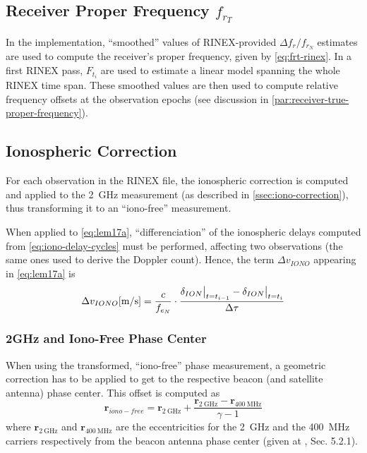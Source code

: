 \subsection{Receiver Proper Frequency $f_{r_T}$}\label{ssec:receiver-true-proper-frequency}
In the implementation, ``smoothed'' values of RINEX-provided $\Delta f_r / f_{r_N}$ estimates 
are used to compute the receiver's proper frequency, given by \autoref{eq:frt-rinex}.
In a first RINEX pass, $F_{t_i}$ are used to estimate a linear model spanning the 
whole RINEX time span. These smoothed values are then used to compute relative 
frequency offsets at the observation epochs (see discussion in \autoref{par:receiver-true-proper-frequency}). 

\subsection{Ionospheric Correction}\label{ssec:iono-correction}
For each observation in the RINEX file, the ionospheric correction is computed 
and applied to the \SI{2}{\GHz} measurement (as described in \autoref{ssec:iono-correction}), 
thus transforming it to an ``iono-free'' measurement.

When applied to \autoref{eq:lem17a}, ``differenciation'' of the ionospheric 
delays computed from \ref{eq:iono-delay-cycles} must be performed, affecting two 
observations (the same ones used to derive the Doppler count). Hence, the term 
$\Delta v_{IONO}$ appearing in \autoref{eq:lem17a} is
\begin{equation}
  \Delta v_{IONO} [\si{\m \per \s}] = 
    \frac{c}{f_{e_N}}
    \cdot 
    \frac{\delta_{ION}\at[\big]{t=t_{i-1}} 
    - \delta_{ION}\at[\big]{t=t_i}}{\Delta \tau}
  \label{eq:dion-diff}
\end{equation}

\subsubsection{2GHz and Iono-Free Phase Center}\label{ssec:iono-correction}
When using the transformed, ``iono-free'' phase measurement, a geometric correction 
has to be applied to get to the respective beacon (and satellite antenna) phase 
center. This offset is computed as
\begin{equation}\label{eq:ionf-pco}
  \bm{r}_{iono-free} = \bm{r}_{\SI{2}{\GHz}} + \frac{\bm{r}_{\SI{2}{\GHz}} 
    - \bm{r}_{\SI{400}{\MHz}}}{\gamma - 1}
\end{equation}
where $\bm{r}_{\SI{2}{\GHz}}$ and $\bm{r}_{\SI{400}{\MHz}}$ are the 
eccentricities for the \SI{2}{\GHz} and the \SI{400}{\MHz} carriers respectively 
from the beacon antenna phase center (given at \cite{DORISGSM}, Sec. 5.2.1).

